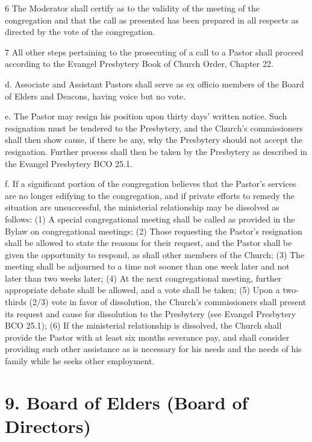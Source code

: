 \documentclass[
]{book}
\begin{document}
\(6\) The Moderator shall certify as to the validity of the meeting of the congregation and that the call as presented has been prepared in all respects as directed by the vote of the congregation.

\(7\) All other steps pertaining to the prosecuting of a call to a Pastor shall proceed according to the Evangel Presbytery Book of Church Order, Chapter 22.

d. Associate and Assistant Pastors shall serve as ex officio members of the Board of Elders and Deacons, having voice but no vote.

e. The Pastor may resign his position upon thirty days' written notice. Such resignation must be tendered to the Presbytery, and the Church's commissioners shall then show cause, if there be any, why the Presbytery should not accept the resignation. Further process shall then be taken by the Presbytery as described in the Evangel Presbytery BCO 25.1.

f. If a significant portion of the congregation believes that the Pastor's services are no longer edifying to the congregation, and if private efforts to remedy the situation are unsuccessful, the ministerial relationship may be dissolved as follows: (1) A special congregational meeting shall be called as provided in the Bylaw on congregational meetings; (2) Those requesting the Pastor's resignation shall be allowed to state the reasons for their request, and the Pastor shall be given the opportunity to respond, as shall other members of the Church; (3) The meeting shall be adjourned to a time not sooner than one week later and not later than two weeks later; (4) At the next congregational meeting, further appropriate debate shall be allowed, and a vote shall be taken; (5) Upon a two-thirds (2/3) vote in favor of dissolution, the Church's commissioners shall present its request and cause for dissolution to the Presbytery (see Evangel Presbytery BCO 25.1); (6) If the ministerial relationship is dissolved, the Church shall provide the Pastor with at least six months severance pay, and shall consider providing such other assistance as is necessary for his needs and the needs of his family while he seeks other employment.

\hypertarget{board-of-elders-board-of-directors}{%
\section{9. Board of Elders (Board of Directors)}\label{board-of-elders-board-of-directors}}
\end{document}
